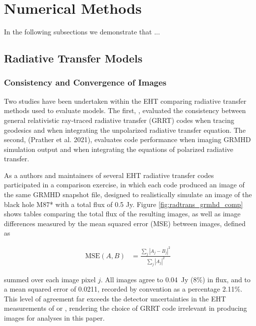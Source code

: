 \section{Numerical Methods}\label{app:numerical}

In the following subsections we demonstrate that 
...


\subsection{Radiative Transfer Models}
\label{app:radtrans}

\subsubsection{Consistency and Convergence of Images}


Two studies have been undertaken within the EHT comparing radiative transfer methods used to evaluate models.  The first, \cite{2020ApJ...897..148G}, evaluated the consistency between general relativistic ray-traced radiative transfer (GRRT) codes when tracing geodesics and when integrating the unpolarized radiative transfer equation.  The second, (Prather et al. 2021), evaluates code performance when imaging GRMHD simulation output and when integrating the equations of polarized radiative transfer.

As a  authors and maintainers of several EHT radiative transfer codes participated in a comparison exercise, in which each code produced an image of the same GRMHD snapshot file, designed to realistically simulate an image of the black hole M87* with a total flux of 0.5 Jy.  Figure \ref{fig:radtrans_grmhd_comp} shows tables comparing the total flux of the resulting images, as well as image differences measured by the mean squared error (MSE) between images, defined as

\begin{align}
    \mathrm{MSE}(A, B) &= \frac{\sum_j|A_j-B_j|^2}{\sum_j|A_j|^2}
\end{align}

summed over each image pixel $j$. All images agree to 0.04~Jy (8\%) in flux, and to a mean squared error of 0.0211, recorded by convention as a percentage 2.11\%.  This level of agreement far exceeds the detector uncertainties in the EHT measurements of \sgra or , rendering the choice of GRRT code irrelevant in producing images for analyses in this paper.


